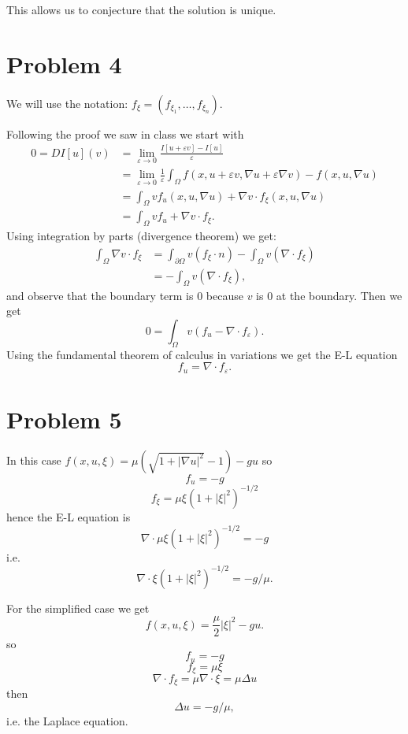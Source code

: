 \documentclass{article}
\begin{document}
This allows us to conjecture that the solution is unique.
\section{Problem 4}
We will use the notation: $f_\xi = (f_{\xi_1},\dots,f_{\xi_n})$.

Following the proof we saw in class we start with
\begin{align*}
	0=DI[u](v)
	&= \lim_{\varepsilon \to 0}\frac{I[u+\varepsilon v]-I[u]}{\varepsilon}\\
	&=\lim_{\varepsilon \to 0} \frac{1}{\varepsilon}\int_\Omega f(x,u+\varepsilon v,\nabla u+\varepsilon
	\nabla v)-f(x,u,\nabla u)\\
	&=\int_\Omega vf_u(x,u,\nabla u)+\nabla v\cdot f_\xi(x,u,\nabla u)\\
	&=\int_\Omega vf_u+\nabla v\cdot f_\xi.
\end{align*}
Using integration by parts (divergence theorem) we get:
\begin{align*}
	\int_\Omega\nabla v \cdot f_\xi
	&= \int_{\partial\Omega}v (f_\xi \cdot n) - \int_\Omega v (\nabla \cdot f_\xi)\\
	&= - \int_\Omega v (\nabla \cdot f_\xi),
\end{align*}
and observe that the boundary term is 0 because $v$ is 0 at
the boundary.
Then we get
\[
	0=\int_\Omega v(f_u-\nabla \cdot f_\varepsilon).
\]
Using the fundamental theorem of calculus in variations we get the E-L
equation
\[
	f_u=\nabla \cdot f_\varepsilon.
\]
\section{Problem 5}
In this case $f(x,u,\xi)=\mu(\sqrt{1+|\nabla u|^2}-1)-gu$ so
\[
	f_u=-g
\]
\[
	f_\xi=\mu\xi(1+|\xi|^2)^{-1/2}
\]
hence the E-L equation is
\[
	\nabla \cdot \mu\xi(1+|\xi|^2)^{-1/2} = -g
\]
i.e.
\[
	\nabla \cdot \xi(1+|\xi|^2)^{-1/2}=-g/\mu.
\]

For the simplified case we get
\[
f(x,u,\xi)=\frac{\mu}{2}|\xi|^2-gu.
\]
so
\[
	f_u=-g
\]
\[
	f_\xi = \mu\xi
\]
\[
	\nabla \cdot f_\xi = \mu \nabla \cdot \xi = \mu \Delta u
\]
then
\[
	\Delta u =-g/\mu,
\]
i.e. the Laplace equation.
\end{document}
